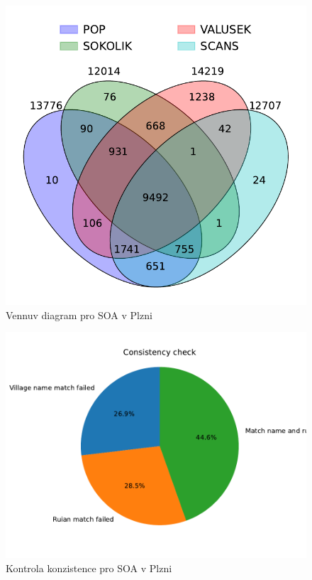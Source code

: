 \begin{figure}[htbp]
\centering
    \includegraphics[scale=.5]{obrazky-figures/dataAnalysis/soaPlzen/Venn_4.pdf}
    \caption{Vennuv diagram pro SOA v Plzni}
\end{figure}

\begin{figure}[htbp]
\centering
    \includegraphics[scale=.5]{obrazky-figures/dataAnalysis/soaPlzen/consistencyCheck2.pdf}
    \caption{Kontrola konzistence pro SOA v Plzni}
\end{figure}



